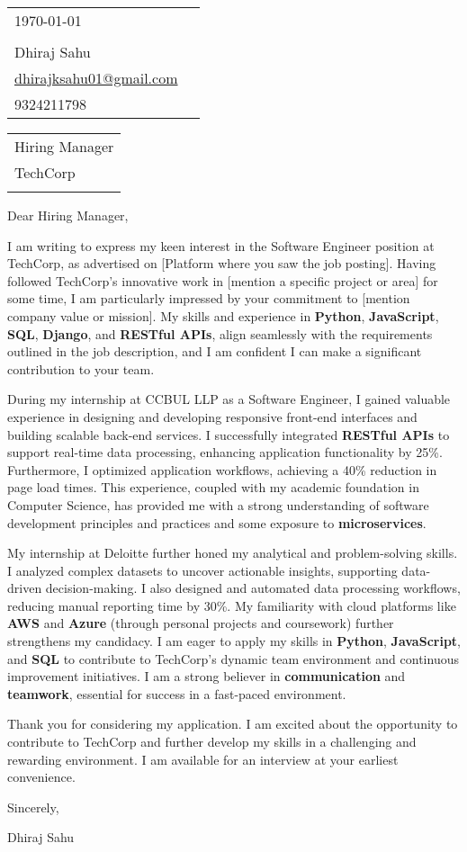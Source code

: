 \documentclass[11pt]{article}
\begin{document}
\begin{tabular}{ll}
\today & \\
\vspace{0.5cm} \\
Dhiraj Sahu & \\
\href{mailto:dhirajksahu01@gmail.com}{dhirajksahu01@gmail.com} & \\
9324211798 & \\
\end{tabular}

\vspace{1cm}

\begin{tabular}{l}
Hiring Manager \\
TechCorp \\
[Company Address] \\
\end{tabular}

\vspace{1cm}

Dear Hiring Manager,

I am writing to express my keen interest in the Software Engineer position at TechCorp, as advertised on [Platform where you saw the job posting]. Having followed TechCorp's innovative work in [mention a specific project or area] for some time, I am particularly impressed by your commitment to [mention company value or mission]. My skills and experience in \textbf{Python}, \textbf{JavaScript}, \textbf{SQL}, \textbf{Django}, and \textbf{RESTful APIs}, align seamlessly with the requirements outlined in the job description, and I am confident I can make a significant contribution to your team.

During my internship at CCBUL LLP as a Software Engineer, I gained valuable experience in designing and developing responsive front-end interfaces and building scalable back-end services. I successfully integrated \textbf{RESTful APIs} to support real-time data processing, enhancing application functionality by 25\%. Furthermore, I optimized application workflows, achieving a 40\% reduction in page load times. This experience, coupled with my academic foundation in Computer Science, has provided me with a strong understanding of software development principles and practices and some exposure to \textbf{microservices}.

My internship at Deloitte further honed my analytical and problem-solving skills. I analyzed complex datasets to uncover actionable insights, supporting data-driven decision-making. I also designed and automated data processing workflows, reducing manual reporting time by 30\%. My familiarity with cloud platforms like \textbf{AWS} and \textbf{Azure} (through personal projects and coursework) further strengthens my candidacy. I am eager to apply my skills in \textbf{Python}, \textbf{JavaScript}, and \textbf{SQL} to contribute to TechCorp's dynamic team environment and continuous improvement initiatives. I am a strong believer in \textbf{communication} and \textbf{teamwork}, essential for success in a fast-paced environment.

Thank you for considering my application. I am excited about the opportunity to contribute to TechCorp and further develop my skills in a challenging and rewarding environment. I am available for an interview at your earliest convenience.

\vspace{0.5cm}

Sincerely,

Dhiraj Sahu
\end{document}
